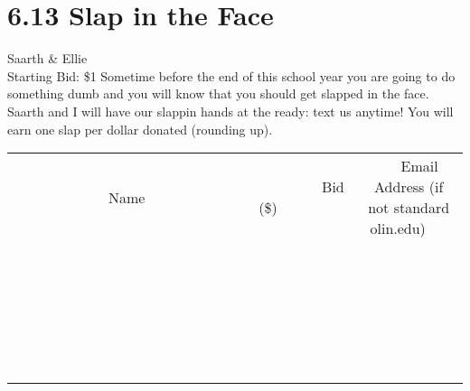 \documentclass[11pt]{article}
\begin{document}
\section*{6.13 Slap in the Face}
Saarth \& Ellie
\\
Starting Bid: \$1
\newline
Sometime before the end of this school year you are going to do something dumb and you will know that you should get slapped in the face. Saarth and I will have our slappin hands at the ready: text us anytime! You will earn one slap per dollar donated (rounding up).
\\[6ex]
\begin{tabular}{c c c}
~~~~~~~~~~~~~Name~~~~~~~~~~~~~ & ~~~~~~~~~Bid (\$)~~~~~~~~~  & ~~~Email Address (if not standard olin.edu)~~~\\
 & & \\
\hline
 & & \\
\hline
 & & \\
\hline
 & & \\
\hline
 & & \\
\hline
 & & \\
\hline
 & & \\
\hline
 & & \\
\hline
 & & \\
\hline
 & & \\
\hline
 & & \\
\hline
 & & \\
\hline
 & & \\
\hline
 & & \\
\hline
 & & \\
\hline
 & & \\
\hline
 & & \\
\hline
 & & \\
\hline
 & & \\
\hline
 & & \\
\hline
 & & \\
\hline
 & & \\
\hline
 & & \\
\hline
 & & \\
\hline
 & & \\
\hline
 & & \\
\hline
\end{tabular}
\newpage
\end{document}
